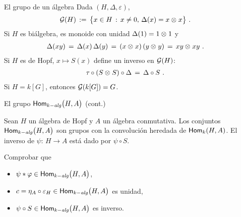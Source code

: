 \begin{frame}{El grupo de un \'{a}lgebra}
	Dada $(H,\Delta,\varepsilon)$,
	\begin{align*}
		\grouplike H & \,:=\,\big\{x\in H\,:\,x\not=0,\,
			\Delta(x)=x\tensor x\big\}
		\text{ .}
	\end{align*}
	Si $H$ es bi\'{a}lgebra, es monoide con unidad $\Delta(1)=1\tensor 1$ y
	\begin{align*}
		\Delta(xy) & \,=\,\Delta(x)\,\Delta(y)\,=\,
			(x\tensor x)\,(y\tensor y) \,=\,xy\tensor xy
		\text{ .}
	\end{align*}
	Si $H$ es de Hopf, $x\mapsto S(x)$ define un inverso en
	$\grouplike H$:
	\begin{align*}
		\swap\circ(S\tensor S)\circ\Delta & \,=\,
			\Delta\circ S
		\text{ .}
	\end{align*}
	Si $H=k[G]$, entonces $\grouplike{k[G]}=G$.
\end{frame}

\begin{frame}{El grupo $\Homalg\big(H,A\big)$ (cont.)}
	\begin{teoGrupoDeMorfismos}\label{thm:grupodemorfismos}
		Sean $H$ un \'{a}lgebra de Hopf y $A$ un \'{a}lgebra
		conmutativa. Los conjuntos $\Homalg\big(H,A\big)$ son grupos
		con la convoluci\'{o}n heredada de $\Hom[k](H,A)$. El inverso
		de $\psi:\,H\rightarrow A$ est\'{a} dado por $\psi\circ S$.
	\end{teoGrupoDeMorfismos}
	Comprobar que
	\begin{itemize}
		\item $\psi\convol\varphi\in\Homalg\big(H,A\big)$,
		\item $c =\eta_A\circ\varepsilon_H\in\Homalg\big(H,A\big)$ es
			unidad,
		\item $\psi\circ S\in\Homalg\big(H,A\big)$ es inverso.
	\end{itemize}
\end{frame}


